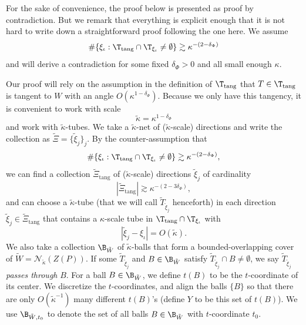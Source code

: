 \documentclass{article}
\numberwithin{equation}{section}
\theoremstyle{plain}
\begin{document}
For the sake of convenience, the proof below is presented as proof by contradiction. But we remark that everything is explicit enough that it is not hard to write down a straightforward proof following the one here. We assume 
\begin{equation}
\#
\{
\xi_{\iota}: \T_{\mathrm{tang}}\cap \T_{\xi_{\iota}}\neq \emptyset 
\}
\gtrsim 
\kappa^{-(2-\delta_{\Phi})}
\end{equation}
and will derive a contradiction for some fixed $\delta_{\Phi}>0$ and all small enough $\kappa$. 

Our proof will rely on the assumption in the definition of $\T_{\mathrm{tang}}$ that $T \in \T_{\mathrm{tang}}$ is tangent to $W$ with an angle $O(\kappa^{1-\delta_{\Phi}})$. Because we only have this tangency, it is convenient to work with scale \[\tilde{\kappa} = \kappa^{1-\delta_{\Phi}}\] and work with $\tilde{\kappa}$-tubes.  We take a $\tilde{\kappa}$-net of ($\tilde{\kappa}$-scale) directions and write the collection as $\tilde{\Xi} = \{\tilde{\xi}_j\}_{j}$. By the counter-assumption that
\begin{equation}
    \#
\{
\xi_{\iota}: \T_{\mathrm{tang}}\cap \T_{\xi_{\iota}}\neq \emptyset 
\}
\gtrsim 
\kappa^{-(2-\delta_{\Phi})},
\end{equation}
we can find a collection $\tilde{\Xi}_{\text{tang}}$ of ($\tilde{\kappa}$-scale) directions $\tilde{\xi}_j$ of cardinality \[|\tilde{\Xi}_{\text{tang}}|\gtrsim \kappa^{-(2-3\delta_{\Phi})},\] and can choose a $\tilde{\kappa}$-tube (that we will call $\tilde{T}_{\tilde{\xi}_j}$ henceforth) in each direction $\tilde{\xi}_j \in \tilde{\Xi}_{\text{tang}}$ that contains a $\kappa$-scale tube in  $\T_{\text{tang}}\cap \T_{\xi_{\iota}}$ with 
\begin{equation}
    |\tilde{\xi}_j - \xi_{\iota}| = O(\tilde{\kappa}).
\end{equation}
We also take a collection $\B_{\tilde{W}}$ of $\tilde{\kappa}$-balls that form a bounded-overlapping cover of $\tilde{W} = \mathcal{N}_{\tilde{\kappa}} (Z(P))$. If some $\tilde{T}_{\tilde{\xi}_j}$ and $B \in \B_{\tilde{W}}$ satisfy $\tilde{T}_{\tilde{\xi}_j}\cap B \neq \emptyset$, we say $\tilde{T}_{\tilde{\xi}_j}$ \emph{passes through} $B$. For a ball $B \in \B_{\tilde{W}}$, we define $t(B)$ to be the $t$-coordinate of its center. We discretize the $t$-coordinates, and align the balls $\{B\}$ so that there are only $O(\tilde{\kappa}^{-1})$ many different $t(B)$'s (define $Y$ to be this set of $t(B)$).  We use $\B_{\tilde{W}, t_0}$ to denote the set of all balls $B\in \B_{\tilde{W}}$ with $t$-coordinate $t_0$.
\end{document}
